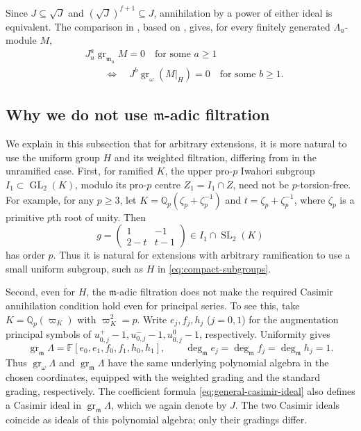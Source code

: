 \documentclass[11pt]{article}
\numberwithin{equation}{section}
\theoremstyle{definition}
\theoremstyle{remark}
\newcommand{\F}{\mathbb F}
\newcommand{\Q}{\mathbb Q}
\newcommand{\fm}{\mathfrak m}
\DeclareMathOperator{\GL}{GL}
\DeclareMathOperator{\SL}{SL}
\DeclareMathOperator{\gr}{gr}
\begin{document}
Since $J\subseteq\sqrt J$
and $(\sqrt J)^{f+1}\subseteq J$, annihilation by a power
of either ideal is equivalent.
The comparison in
\cite[\S~6.4]{Sor26b}, based on
\cite[\S~6, Lemmas~1--4]{Sor26a}, gives, for every finitely
generated $\Lambda_u$-module $M$,
\begin{equation}\label{eq:bhh-casimir-annihilation}
 \begin{aligned}
 &J_u^a\gr_{\mathfrak m_u}M=0\quad\text{for some }a\geq1\\
 &\qquad\Longleftrightarrow\quad
 J^b\gr_\omega(M|_H)=0
                       \quad\text{for some }b\geq1.
 \end{aligned}
\end{equation}

\subsection{Why we do not use \texorpdfstring{$\mathfrak m$}{m}-adic filtration}
\label{subsec:why-not-augmentation}

We explain in this subsection that for arbitrary extensions, it is more natural to use the uniform group $H$ and its weighted
filtration, differing from \cite{BHH23} in the unramified case. First, for ramified $K$, the upper pro-$p$ Iwahori subgroup
$I_1\subset\GL_2(K)$, modulo its pro-$p$ centre $Z_1=I_1\cap Z$,
need not be $p$-torsion-free. For example, for any $p\geq3$,
let $K=\Q_p(\zeta_p+\zeta_p^{-1})$ and $t=\zeta_p+\zeta_p^{-1}$,
where $\zeta_p$ is a primitive $p$th root of unity. Then
\[
 g=\begin{pmatrix}1&-1\\2-t&t-1\end{pmatrix}\in I_1\cap\SL_2(K)
\]
has order $p$. Thus it is natural for extensions with arbitrary
ramification to use a small uniform subgroup, such as
$H$ in \eqref{eq:compact-subgroups}.

Second, even for $H$, the $\fm$-adic filtration does not make the
required Casimir annihilation condition hold even for principal series.
To see this, take $K=\Q_p(\varpi_K)$ with $\varpi_K^2=p$.
Write $e_j,f_j,h_j$ ($j=0,1$) for the augmentation principal symbols
of $u^+_{0,j}-1,u^-_{0,j}-1,u^0_{0,j}-1$, respectively. Uniformity gives
\[
 \gr_{\fm}\Lambda=\F[e_0,e_1,f_0,f_1,h_0,h_1],
 \qquad \deg_{\fm}e_j=\deg_{\fm}f_j=\deg_{\fm}h_j=1.
\]
Thus $\gr_\omega\Lambda$ and $\gr_{\fm}\Lambda$ have the same
underlying polynomial algebra in the chosen coordinates, equipped
with the weighted grading and the standard grading, respectively.
The coefficient formula \eqref{eq:general-casimir-ideal} also defines
a Casimir ideal in $\gr_{\fm}\Lambda$, which we again denote by $J$.
The two Casimir ideals coincide as ideals of this polynomial algebra;
only their gradings differ.
\end{document}
